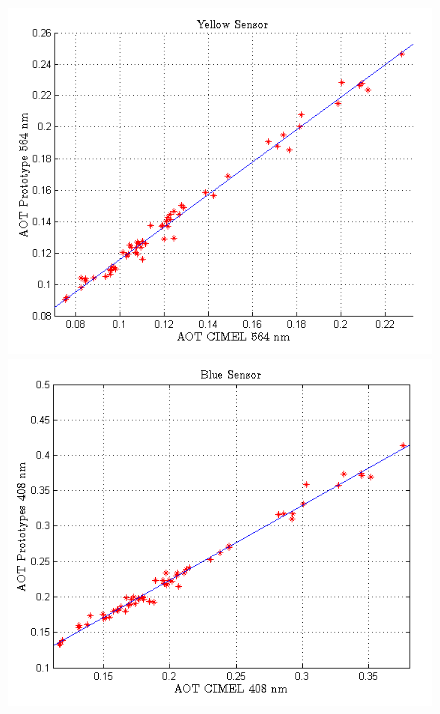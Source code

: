 \documentclass[12pt,letterpaper]{article}
\numberwithin{figure}{section}
\numberwithin{equation}{section}
\numberwithin{table}{section}
\begin{document}
\begin{figure}[!htb]
    \centering
    \begin{minipage}{.5\textwidth}
        \centering
        \includegraphics[width=\linewidth]{Figuras/amarillo.png}
    \end{minipage}%
    \begin{minipage}{0.5\textwidth}
        \centering
        \includegraphics[width=\linewidth]{Figuras/azul.png}   
    \end{minipage} 
    \begin{minipage}{.5\textwidth}

\end{minipage}
\end{figure}
\end{document}
